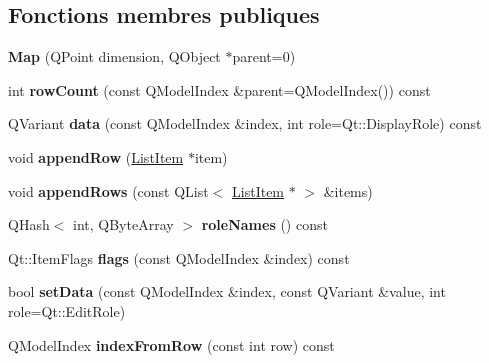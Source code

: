 \subsection*{Fonctions membres publiques}
\begin{DoxyCompactItemize}
\item 
{\bfseries Map} (Q\+Point dimension, Q\+Object $\ast$parent=0)\hypertarget{class_map_a90ec6843da03a0a35b5bada4505a4635}{}\label{class_map_a90ec6843da03a0a35b5bada4505a4635}

\item 
int {\bfseries row\+Count} (const Q\+Model\+Index \&parent=Q\+Model\+Index()) const \hypertarget{class_map_a862e43cd326ff8b128b975c6baf67299}{}\label{class_map_a862e43cd326ff8b128b975c6baf67299}

\item 
Q\+Variant {\bfseries data} (const Q\+Model\+Index \&index, int role=Qt\+::\+Display\+Role) const \hypertarget{class_map_a75ef3a8e891399024c999c0fbc776fc6}{}\label{class_map_a75ef3a8e891399024c999c0fbc776fc6}

\item 
void {\bfseries append\+Row} (\hyperlink{class_list_item}{List\+Item} $\ast$item)\hypertarget{class_map_af9c1c309f6f8342664501ad584ebccaf}{}\label{class_map_af9c1c309f6f8342664501ad584ebccaf}

\item 
void {\bfseries append\+Rows} (const Q\+List$<$ \hyperlink{class_list_item}{List\+Item} $\ast$ $>$ \&items)\hypertarget{class_map_a1d680ec74568ec6e90c7d6e044e4a489}{}\label{class_map_a1d680ec74568ec6e90c7d6e044e4a489}

\item 
Q\+Hash$<$ int, Q\+Byte\+Array $>$ {\bfseries role\+Names} () const \hypertarget{class_map_af1ec969f88b85d1c90095745cfc599ef}{}\label{class_map_af1ec969f88b85d1c90095745cfc599ef}

\item 
Qt\+::\+Item\+Flags {\bfseries flags} (const Q\+Model\+Index \&index) const \hypertarget{class_map_ac4ce2a5b33e908b860cdf370013c4e9e}{}\label{class_map_ac4ce2a5b33e908b860cdf370013c4e9e}

\item 
bool {\bfseries set\+Data} (const Q\+Model\+Index \&index, const Q\+Variant \&value, int role=Qt\+::\+Edit\+Role)\hypertarget{class_map_a574e69dc23fb4d1a1608d9c9cd120ba6}{}\label{class_map_a574e69dc23fb4d1a1608d9c9cd120ba6}

\item 
Q\+Model\+Index {\bfseries index\+From\+Row} (const int row) const \hypertarget{class_map_a85abd5d3107771ec4137ca8fdf26c12d}{}\label{class_map_a85abd5d3107771ec4137ca8fdf26c12d}


\end{DoxyCompactItemize}
